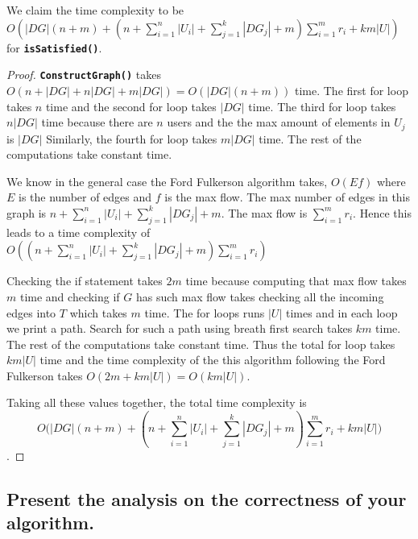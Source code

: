 \documentclass[11pt]{scrartcl}
\newcommand{\FuncCall}[2]{\texttt{\bfseries #1(#2)}}
\begin{document}
We claim the time complexity to be $O(|DG|(n+m)+ 
(n + \sum_{i=1}^n|U_i| + \sum_{j=1}^k|DG_j| + m)\sum_{i=1}^m r_i + km|U|)$ for \FuncCall{isSatisfied}{}.
\begin{proof}
\FuncCall{ConstructGraph}{} takes $O(n + |DG| + n|DG| + m|DG|) = O(|DG|(n+m))$ time.
The first for loop takes $n$ time and the second for loop takes $|DG|$ time. 
The third for loop takes $n|DG|$ time because there are $n$ users and the the max amount of elements in $U_j$ is $|DG|$
Similarly, the fourth for loop takes $m|DG|$ time. The rest of the computations take constant time. 

We know in the general case
the Ford Fulkerson algorithm takes, $O(Ef)$ where $E$ is the number of edges and $f$ is the max flow. 
The max number of edges in this graph is $n + \sum_{i=1}^n|U_i| + \sum_{j=1}^k|DG_j| + m$. The max flow is $\sum_{i=1}^m r_i$.
Hence this leads to a time complexity of $O((n + \sum_{i=1}^n|U_i| + \sum_{j=1}^k|DG_j| + m)\sum_{i=1}^m r_i)$

Checking the if statement takes $2m$ time because computing that max flow takes $m$ time and checking if 
$G$ has such max flow takes checking all the incoming edges into $T$ which takes $m$ time.  
The for loops runs $|U|$ times and in each loop we print a path. Search for such a path using breath first search 
takes $km$ time. The rest of the computations take constant time. Thus the total for loop takes $km|U|$ time
and the time complexity of the this algorithm following the Ford Fulkerson takes $O(2m + km|U|) = O(km|U|)$.


Taking all these values together, the total time complexity is $$O\Bigg(|DG|(n+m)+ 
(n + \sum_{i=1}^n|U_i| + \sum_{j=1}^k|DG_j| + m)\sum_{i=1}^m r_i + km|U| \Bigg)$$.

\end{proof}


\subsection{
	Present the analysis on the correctness of your algorithm.
}
\end{document}
